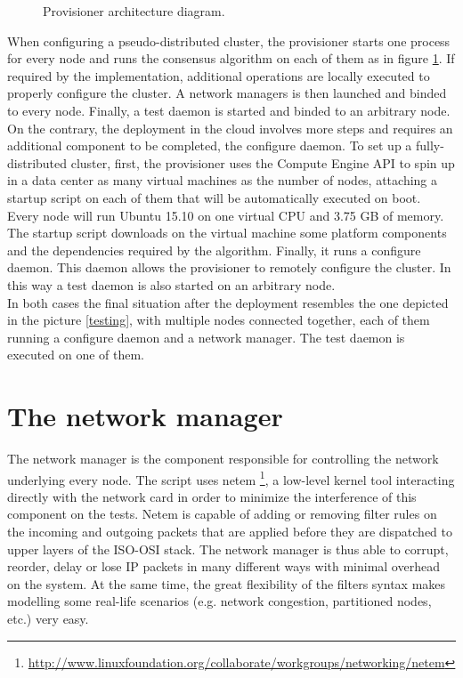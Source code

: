 \begin{figure}[H]
  \caption{Provisioner architecture diagram.}
  \label{actors}
\end{figure}

When configuring a pseudo-distributed cluster, the provisioner starts one process for every node and runs the consensus algorithm on each of them as in figure \ref{actors}. If required by the implementation, additional operations are locally executed to properly configure the cluster. A network managers is then launched and binded to every node. Finally, a test daemon is started and binded to an arbitrary node.\\
On the contrary, the deployment in the cloud involves more steps and requires an additional component to be completed, the configure daemon. To set up a fully-distributed cluster, first, the provisioner uses the Compute Engine API to spin up in a data center as many virtual machines as the number of nodes, attaching a startup script on each of them that will be automatically executed on boot.\\
Every node will run Ubuntu 15.10 on one virtual CPU and 3.75 GB of memory. The startup script downloads on the virtual machine some platform components and the dependencies required by the algorithm. Finally, it runs a configure daemon. This daemon allows the provisioner to remotely configure the cluster. In this way a test daemon is also started on an arbitrary node.\\
In both cases the final situation after the deployment resembles the one depicted in the picture \ref{testing}, with multiple nodes connected together, each of them running a configure daemon and a network manager. The test daemon is executed on one of them.

\section{The network manager}
The network manager is the component responsible for controlling the network underlying every node. The script uses netem \footnote{\url{http://www.linuxfoundation.org/collaborate/workgroups/networking/netem}}, a low-level kernel tool interacting directly with the network card in order to minimize the interference of this component on the tests. Netem is capable of adding or removing filter rules on the incoming and outgoing packets that are applied before they are dispatched to upper layers of the ISO-OSI stack. The network manager is thus able to corrupt, reorder, delay or lose IP packets in many different ways with minimal overhead on the system. At the same time, the great flexibility of the filters syntax makes modelling some real-life scenarios (e.g. network congestion, partitioned nodes, etc.) very easy.

